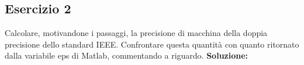 \subsection{Esercizio 2}
Calcolare, motivandone i passaggi, la precisione di macchina della doppia precisione 
dello standard IEEE. Confrontare questa quantità con quanto ritornato dalla variabile eps di
Matlab, commentando a riguardo.
\newline \textbf{Soluzione:}


